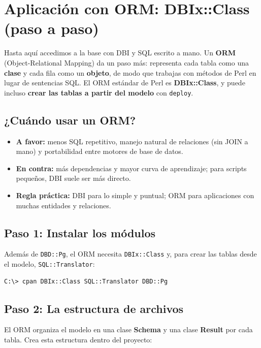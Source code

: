 \documentclass[11pt]{article}
\begin{document}
\section{Aplicación con ORM: DBIx::Class (paso a paso)}
Hasta aquí accedimos a la base con DBI y SQL escrito a mano. Un \textbf{ORM} (Object-Relational Mapping) da un paso más: representa cada tabla como una \textbf{clase} y cada fila como un \textbf{objeto}, de modo que trabajas con métodos de Perl en lugar de sentencias SQL. El ORM estándar de Perl es \textbf{DBIx::Class}, y puede incluso \textbf{crear las tablas a partir del modelo} con \texttt{deploy}.

\subsection{¿Cuándo usar un ORM?}
\begin{itemize}[leftmargin=1.4em,itemsep=2pt,topsep=2pt]
\item \textbf{A favor:} menos SQL repetitivo, manejo natural de relaciones (sin JOIN a mano) y portabilidad entre motores de base de datos.
\item \textbf{En contra:} más dependencias y mayor curva de aprendizaje; para scripts pequeños, DBI suele ser más directo.
\item \textbf{Regla práctica:} DBI para lo simple y puntual; ORM para aplicaciones con muchas entidades y relaciones.
\end{itemize}
\subsection{Paso 1: Instalar los módulos}
Además de \texttt{DBD::Pg}, el ORM necesita \texttt{DBIx::Class} y, para crear las tablas desde el modelo, \texttt{SQL::Translator}:

\begin{cajacodigo}
\begin{lstlisting}[style=markup]
C:\> cpan DBIx::Class SQL::Translator DBD::Pg
\end{lstlisting}
\end{cajacodigo}
\vspace{2pt}
\subsection{Paso 2: La estructura de archivos}
El ORM organiza el modelo en una clase \textbf{Schema} y una clase \textbf{Result} por cada tabla. Crea esta estructura dentro del proyecto:
\end{document}
